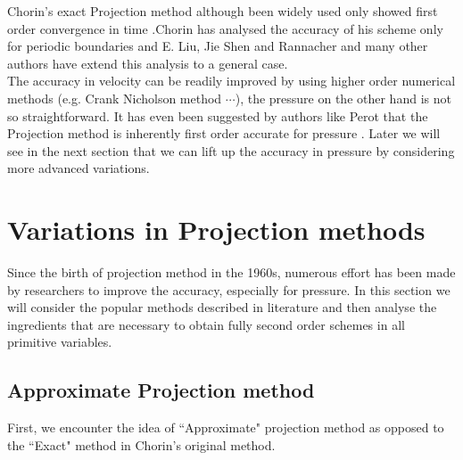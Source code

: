 Chorin's exact Projection method although been widely used only showed first order convergence in time  \cite{chorin1968numerical,brown2001accurate,shen1992error,rannacher1992chorin}.Chorin has analysed the accuracy of his scheme only for periodic boundaries \cite{chorin1969convergence} and E. Liu, Jie Shen and Rannacher \cite{liu1996projection,shen1992error,rannacher1992chorin} and many other authors have extend this analysis to a general case.\\

The accuracy in velocity can be readily improved by using higher order numerical methods (e.g. Crank Nicholson method $\cdots$), the pressure on the other hand is not so straightforward. It has even been suggested by authors like Perot that the Projection method is inherently first order accurate for pressure \cite{perot1993analysis}. Later we will see in the next section that we can lift up the accuracy in pressure by considering more advanced variations.

\newpage
\section{Variations in Projection methods}
Since the birth of projection method in the 1960s, numerous effort has been made by researchers to improve the accuracy, especially for pressure. In this section we will consider the popular methods described in literature and then analyse the  ingredients that are necessary to obtain fully second order schemes in all primitive variables.

\subsection{Approximate Projection method}
First, we encounter the idea of ``Approximate" projection method as opposed to the ``Exact" method in Chorin's original method.\\

